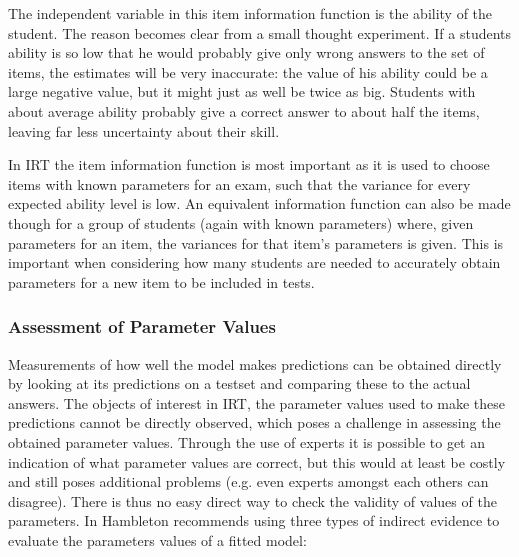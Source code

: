 \documentclass{scrartcl}
\begin{document}
The independent variable in this item information function is the ability of the student. The reason becomes clear from a small thought experiment. If a students ability is so low that he would probably give only wrong answers to the set of items, the estimates will be very inaccurate: the value of his ability could be a large negative value, but it might just as well be twice as big. Students with about average ability probably give a correct answer to about half the items, leaving far less uncertainty about their skill.

In IRT the item information function is most important as it is used to choose items with known parameters for an exam, such that the variance for every expected ability level is low. An equivalent information function can also be made though for a group of students (again with known parameters) where, given parameters for an item, the variances for that item's parameters is given. This is important when considering how many students are needed to accurately obtain parameters for a new item to be included in tests. 



\subsubsection{Assessment of Parameter Values}
\label{sec:asses}
Measurements of how well the model makes predictions can be obtained directly by looking at its predictions on a testset and comparing these to the actual answers. The objects of interest in IRT, the parameter values used to make these predictions cannot be directly observed, which poses a challenge in assessing the obtained parameter values. Through the use of experts it is possible to get an indication of what parameter values are correct, but this would at least be costly and still poses additional problems (e.g. even experts amongst each others can disagree). There is thus no easy direct way to check the validity of values of the parameters. In \cite{hambleton} Hambleton recommends using three types of indirect evidence to evaluate the parameters values of a fitted model:
\end{document}
